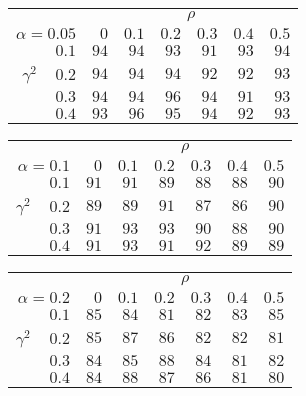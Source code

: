 \begin{tabular}{r|rrrrrr}
\hline\hline
 &\multicolumn{6}{c}{$\rho$} \\ 
 $\alpha = 0.05$ & $0$ & $0.1$ & $0.2$ & $0.3$ & $0.4$ & $0.5$ \\ 
 \hline$0.1$ & $94$ & $94$ & $93$ & $91$ & $93$ & $94$\\ 
$\gamma^2\;\;\;$ $0.2$ & $94$ & $94$ & $94$ & $92$ & $92$ & $93$\\ 
$0.3$ & $94$ & $94$ & $96$ & $94$ & $91$ & $93$\\ 
$0.4$ & $93$ & $96$ & $95$ & $94$ & $92$ & $93$\\ 
 \hline 
 \end{tabular}
 
 \vspace{2em} 
 
\begin{tabular}{r|rrrrrr}
\hline\hline
 &\multicolumn{6}{c}{$\rho$} \\ 
 $\alpha = 0.1$ & $0$ & $0.1$ & $0.2$ & $0.3$ & $0.4$ & $0.5$ \\ 
 \hline$0.1$ & $91$ & $91$ & $89$ & $88$ & $88$ & $90$\\ 
$\gamma^2\;\;\;$ $0.2$ & $89$ & $89$ & $91$ & $87$ & $86$ & $90$\\ 
$0.3$ & $91$ & $93$ & $93$ & $90$ & $88$ & $90$\\ 
$0.4$ & $91$ & $93$ & $91$ & $92$ & $89$ & $89$\\ 
 \hline 
 \end{tabular}
 
 \vspace{2em} 
 
\begin{tabular}{r|rrrrrr}
\hline\hline
 &\multicolumn{6}{c}{$\rho$} \\ 
 $\alpha = 0.2$ & $0$ & $0.1$ & $0.2$ & $0.3$ & $0.4$ & $0.5$ \\ 
 \hline$0.1$ & $85$ & $84$ & $81$ & $82$ & $83$ & $85$\\ 
$\gamma^2\;\;\;$ $0.2$ & $85$ & $87$ & $86$ & $82$ & $82$ & $81$\\ 
$0.3$ & $84$ & $85$ & $88$ & $84$ & $81$ & $82$\\ 
$0.4$ & $84$ & $88$ & $87$ & $86$ & $81$ & $80$\\ 
 \hline 
 \end{tabular}